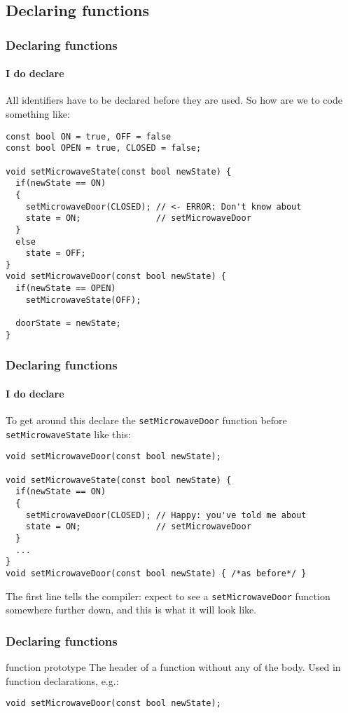 \documentclass{beamer}
\begin{document}
\subsection{Declaring functions}

\begin{frame}[fragile]
  \frametitle{Declaring functions}
  \framesubtitle{I do declare}
  
  All identifiers have to be declared before they are used.  So how are we to code something like:
  \begin{lstlisting}
const bool ON = true, OFF = false
const bool OPEN = true, CLOSED = false;

void setMicrowaveState(const bool newState) {
  if(newState == ON)
  {
    setMicrowaveDoor(CLOSED); // <- ERROR: Don't know about 
    state = ON;               // setMicrowaveDoor 
  }
  else
  	state = OFF;
}
void setMicrowaveDoor(const bool newState) {
  if(newState == OPEN)
    setMicrowaveState(OFF);

  doorState = newState;
}
  \end{lstlisting}
\end{frame}


\begin{frame}[fragile]
  \frametitle{Declaring functions}
  \framesubtitle{I do declare}
  
  To get around this declare the \texttt{setMicrowaveDoor} function before \texttt{setMicrowaveState} like this:
  \begin{lstlisting}
void setMicrowaveDoor(const bool newState);

void setMicrowaveState(const bool newState) {
  if(newState == ON)
  {
    setMicrowaveDoor(CLOSED); // Happy: you've told me about
    state = ON;               // setMicrowaveDoor
  }
  ...
}
void setMicrowaveDoor(const bool newState) { /*as before*/ }
  \end{lstlisting}
  The first line tells the compiler: expect to see a \texttt{setMicrowaveDoor} function somewhere further down, and this is what it will look like.
\end{frame}

\begin{frame}[fragile]
  \frametitle{Declaring functions}
  \begin{defiblocke}{function prototype}%
The header of a function without any of the body. Used in function declarations, e.g.:
    \begin{lstlisting}
void setMicrowaveDoor(const bool newState);
    \end{lstlisting}
  \end{defiblocke}
\end{frame}
\end{document}
